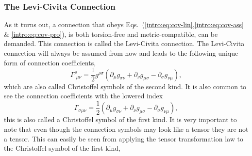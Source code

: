 \subsubsection{The Levi-Civita Connection}
As it turns out, a connection that obeys Eqs.~(\ref{intro:eq:cov-lin},\ref{intro:eq:cov-ass} $\&$ \ref{intro:eq:cov-pro}), is both torsion-free and metric-compatible, can be demanded. This connection is called the Levi-Civita connection. The Levi-Civita connection will always be assumed from now and leads to the following unique form of connection coefficients,
\begin{equation} \label{intro:eq:christoffel_def}
\Gamma^\rho_{\,\,\mu\nu} = \frac{1}{2}g^{\rho\sigma} ( \partial_{\mu} g_{\sigma\nu} + \partial_{\nu} g_{\mu\sigma} - \partial_{\sigma} g_{\nu\mu} ),
\end{equation}
which are also called Christoffel symbols of the second kind. It is also common to see the connection coefficients with the lowered index
\begin{equation}
\Gamma_{\sigma\mu\nu} = \frac{1}{2}( \partial_{\mu} g_{\sigma\nu} + \partial_{\nu} g_{\mu\sigma} - \partial_{\sigma} g_{\nu\mu} ),
\end{equation}
this is also called a Christoffel symbol of the first kind. It is very important to note that even though the connection symbols may look like a tensor they are not a tensor. This can easily be seen from applying the tensor transformation law to the Christoffel symbol of the first kind,
